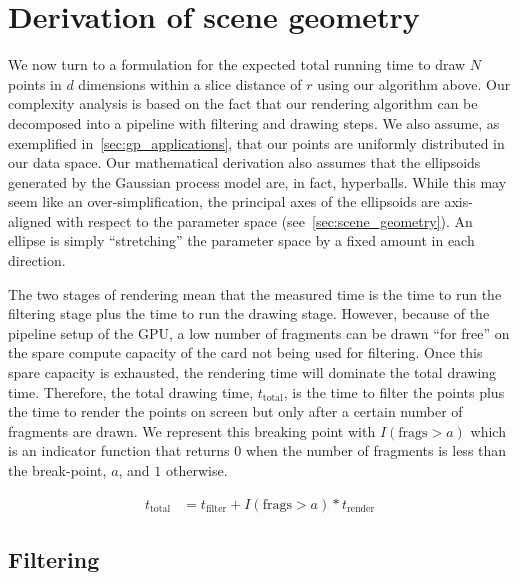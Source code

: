 \section{Derivation of scene geometry}
\label{sec:derivation}

We now turn to a formulation for the expected total running time to draw $N$
points in $d$ dimensions within a slice distance of $r$ using our algorithm 
above. Our complexity
analysis is based on the fact that our rendering algorithm can be decomposed
into a pipeline with filtering and drawing steps. We also assume, as
exemplified in~\autoref{sec:gp_applications}, that our points are uniformly
distributed in our data space.  Our mathematical derivation also assumes that
the ellipsoids generated by the Gaussian process model are, in fact,
hyperballs. While this may seem like an over-simplification, the principal
axes of the ellipsoids are axis-aligned with respect to the parameter 
space (see~\autoref{sec:scene_geometry}).
An ellipse is simply ``stretching'' the parameter space
by a fixed amount in each direction.

The two stages of rendering mean that
the measured time is the time to run the
filtering stage plus the time to run the drawing stage.  However, because
of the pipeline setup of the GPU, a low number of fragments can be drawn
``for free'' on the spare compute capacity of the card not being used for filtering.
Once this spare capacity is exhausted, the rendering time will dominate the
total drawing time.
Therefore,
the total drawing time, $t_\text{total}$, is the time to filter the points
plus the time to render the points on screen but only after a certain 
number of fragments are drawn.  We represent this breaking point with
$I(\text{frags} > a)$ which is an indicator function that returns $0$ when
the number of fragments is less than the break-point, $a$, and $1$ otherwise.

\begin{align}
  t_\text{total} &= t_\text{filter} + I(\text{frags}>a) * t_\text{render}
  \label{eq:acttotal-H}
\end{align}

\subsection{Filtering}
\label{filtering}

